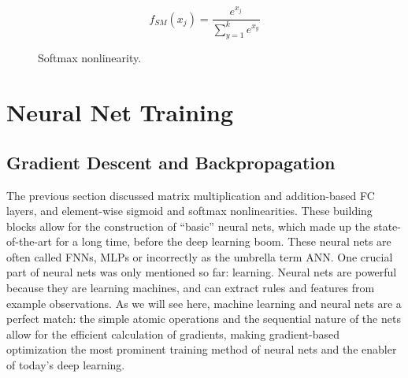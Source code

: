 			\begin{figure}[ht]
				\centering
				\begin{minipage}[t]{0.4\linewidth}
					\begin{equation}
						\label{eq:sm}
						f_{SM}(x_j) = \frac{e^{x_j}}{\sum_{y=1}^{k} e^{x_y}}
					\end{equation}
				\end{minipage}
				\begin{minipage}[t]{0.3\linewidth}
				\end{minipage}
				\caption[Softmax nonlinearity]{Softmax nonlinearity.}
				\label{fig:nonlins_softmax}
			\end{figure}
			
	\section{Neural Net Training}
	
		\subsection{Gradient Descent and Backpropagation}
			\label{cha:deep_learning:sec:sgd_backprop}
			
			The previous section discussed matrix multiplication and addition-based \ac{FC} layers, and element-wise sigmoid and softmax nonlinearities.
			These building blocks allow for the construction of ``basic'' neural nets, which made up the state-of-the-art for a long time, before the deep learning boom.
			These neural nets are often called \acp{FNN}, \acp{MLP} or incorrectly as the umbrella term \ac{ANN}.
			One crucial part of neural nets was only mentioned so far: learning.
			Neural nets are powerful because they are learning machines, and can extract rules and features from example observations.
			As we will see here, machine learning and neural nets are a perfect match: the simple atomic operations and the sequential nature of the nets allow for the efficient calculation of gradients, making gradient-based optimization the most prominent training method of neural nets and the enabler of today's deep learning.
	
